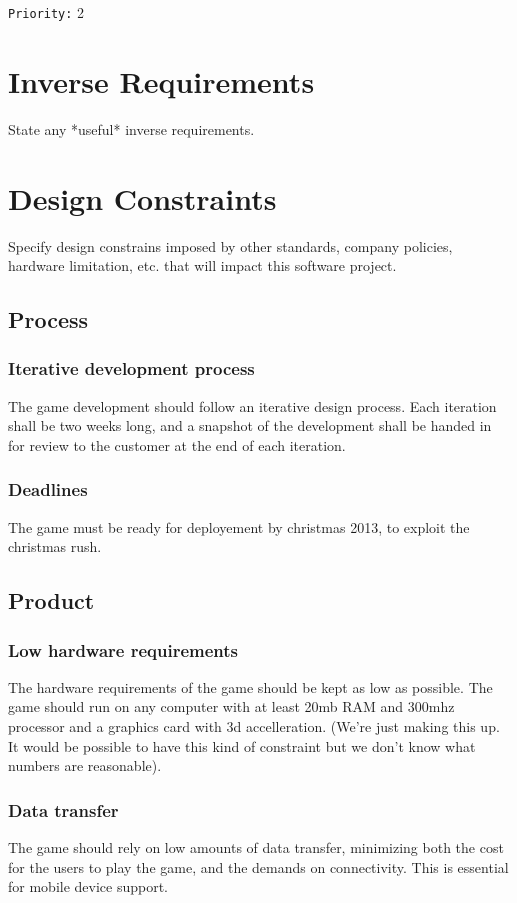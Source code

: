 \documentclass[a4paper,10pt]{article}
\newcommand{\prio}[1]{\texttt{Priority:} #1}
\begin{document}
\prio{2}

\section{Inverse Requirements}
State any *useful* inverse requirements.

\section{Design Constraints}
Specify design constrains imposed by other standards, company policies, hardware limitation, etc. that will impact this software project.

\subsection{Process}
\subsubsection{Iterative development process}
The game development should follow an iterative design process. Each iteration shall be two weeks long, and a snapshot of the development shall be handed in for review to the customer at the end of each iteration.

\subsubsection{Deadlines}
The game must be ready for deployement by christmas 2013, to exploit the christmas rush.

\subsection{Product}
\subsubsection{Low hardware requirements}
\label{hwreq}
The hardware requirements of the game should be kept as low as possible. The game should run on any computer with at least 20mb RAM and 300mhz processor and a graphics card with 3d accelleration. (We're just making this up. It would be possible to have this kind of constraint but we don't know what numbers are reasonable).

\subsubsection{Data transfer}
The game should rely on low amounts of data transfer, minimizing both the cost for the users to play the game, and the demands on connectivity. This is essential for mobile device support.
\end{document}
